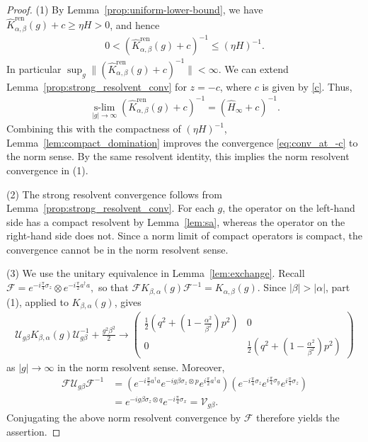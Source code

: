 \documentclass[12pt,dvipdfmx]{article}
\begin{document}
\begin{proof}
(1) By Lemma~\ref{prop:uniform-lower-bound}, we have
$
    \hat{K}_{\alpha,\beta}^{\mathrm{ren} }(g) + c
    \geq
    \eta H > 0$,
and hence
\begin{align*}
    0 < 
    (\hat{K}_{\alpha,\beta}^{\mathrm{ren} }(g) + c)^{-1}
    \le
    (\eta H)^{-1}.
\end{align*}
In particular
$
    \sup_g \|(\hat{K}_{\alpha,\beta}^{\mathrm{ren} }(g) + c)^{-1}\|
    < \infty
$. 
We can extend 
Lemma~\ref{prop:strong_resolvent_conv} for $z=-c$, where $c$ is given by \eqref{c}. 
Thus,  
\begin{align}\label{eq:conv_at_-c}
\operatorname*{s-lim}_{|g|\to\infty}
      (\hat{K}_{\alpha,\beta}^{\mathrm{ren} }(g) + c)^{-1}
    =
    (\hat{H}_\infty + c)^{-1}. 
\end{align}
Combining this with the compactness of $(\eta H)^{-1}$, Lemma~\ref{lem:compact_domination} improves the convergence \eqref{eq:conv_at_-c} to the norm sense. By the same resolvent identity, this implies the norm resolvent convergence in (1).

(2) The strong resolvent convergence follows from Lemma~\ref{prop:strong_resolvent_conv}. For each $g$, the operator on the left-hand side has a compact resolvent by Lemma~\ref{lem:sa}, whereas the operator on the right-hand side does not. Since a norm limit of compact operators is compact, the convergence cannot be in the norm resolvent sense.

(3) We use the unitary equivalence in Lemma~\ref{lem:exchange}. Recall
$
    \mathcal{F}
    =
    e^{-i\frac{\pi}{4}\sigma_z}
    \otimes
    e^{-i\frac{\pi}{2}a^\dagger a},
$
so that
$
    \mathcal{F} K_{\beta,\alpha}(g) \mathcal{F}^{-1}
    =
    K_{\alpha,\beta}(g).
$
Since $|\beta|>|\alpha|$, part (1), applied to $K_{\beta,\alpha}(g)$, gives
\begin{align*}
        \mathcal{U} _{g\beta} K_{\beta,\alpha}(g) \mathcal{U} _{g\beta}^{-1}
        +
        \frac{g^2 \beta^2}{2}
\longrightarrow 
    \begin{pmatrix}
        \frac12 \left(q^2 + \left(1 - \frac{\alpha^2}{\beta^2}\right) p^2\right) & 0\\
        0 & \frac12 \left(q^2 + \left(1 - \frac{\alpha^2}{\beta^2}\right) p^2\right)
    \end{pmatrix}
\end{align*}
as   $|g|\to\infty$ 
in the norm resolvent sense. Moreover,
\begin{align*}
    \mathcal{F} \mathcal{U} _{g\beta} \mathcal{F}^{-1}
    &=
    (e^{-i\frac{\pi}{2}a^\dagger a} e^{-ig\beta \sigma_z \otimes p} e^{i\frac{\pi}{2}a^\dagger a})
    (e^{-i\frac{\pi}{4}\sigma_z} e^{i\frac{\pi}{4}\sigma_y} e^{i\frac{\pi}{4}\sigma_z})
    \\
    &=
    e^{-ig\beta \sigma_z \otimes q} e^{-i\frac{\pi}{4}\sigma_x}
    =
    \mathcal{V}_{g\beta}.
\end{align*}
Conjugating the above norm resolvent convergence by $\mathcal F$ therefore yields the assertion.
\end{proof}
%
%
\end{document}
